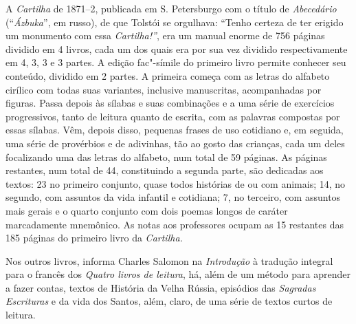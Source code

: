 A \emph{Cartilha} de 1871--2, publicada em S. Petersburgo com o título
de \emph{Abecedário} (``\emph{Ázbuka}'', em russo), de que Tolstói se
orgulhava: ``Tenho certeza de ter erigido um monumento com
essa \emph{Cartilha!''}, era um manual enorme de 756 páginas
dividido em 4 livros, cada um dos quais era por sua vez dividido
respectivamente em 4, 3, 3 e 3 partes. A edição fac"-símile do primeiro
livro permite conhecer seu conteúdo, dividido em 2 partes. A primeira
começa com as letras do alfabeto cirílico com todas suas variantes,
inclusive manuscritas, acompanhadas por figuras. Passa depois às sílabas
e suas combinações e a uma série de exercícios progressivos, tanto de
leitura quanto de escrita, com as palavras compostas por essas sílabas.
Vêm, depois disso, pequenas frases de uso cotidiano e, em seguida, uma
série de provérbios e de adivinhas, tão ao gosto das crianças, cada um
deles focalizando uma das letras do alfabeto, num total de 59 páginas.
As páginas restantes, num total de 44, constituindo a segunda parte, são
dedicadas aos textos: 23 no primeiro conjunto, quase todos histórias de
ou com animais; 14, no segundo, com assuntos da vida infantil e
cotidiana; 7, no terceiro, com assuntos mais gerais e o quarto conjunto
com dois poemas longos de caráter marcadamente mnemônico. As notas aos
professores ocupam as 15 restantes das 185 páginas do primeiro livro
da \emph{Cartilha.}

Nos outros livros, informa Charles Salomon na \emph{Introdução} à
tradução integral para o francês dos \emph{Quatro livros de
leitura}, há, além de um método para aprender a fazer contas, textos de
História da Velha Rússia, episódios das \emph{Sagradas Escrituras} e da vida
dos Santos, além, claro, de uma série de textos curtos de leitura.

